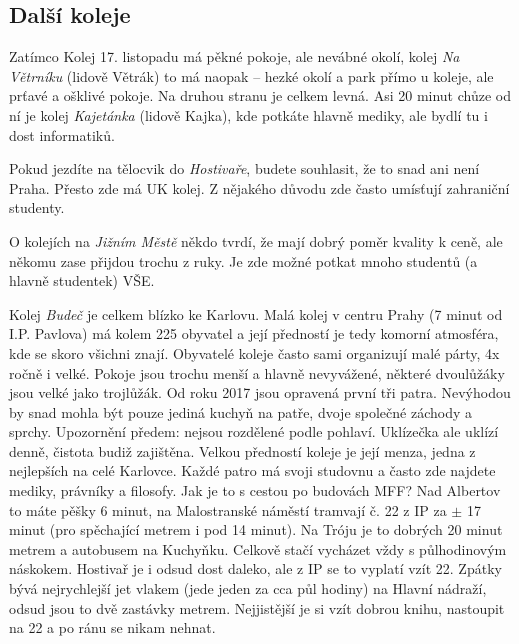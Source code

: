 \subsection{Další koleje}
Zatímco Kolej 17. listopadu má pěkné pokoje, ale nevábné okolí, kolej \textit{Na
Větrníku} (lidově Větrák) to má naopak – hezké okolí a park přímo u koleje, ale
prťavé a ošklivé pokoje. Na druhou stranu je celkem levná. Asi 20 minut chůze od
ní je kolej \textit{Kajetánka} (lidově Kajka), kde potkáte hlavně mediky, ale
bydlí tu i dost informatiků.

Pokud jezdíte na tělocvik do \textit{Hostivaře}, budete souhlasit, že to snad
ani není Praha. Přesto zde má UK kolej. Z nějakého důvodu zde často umísťují
zahraniční studenty.

O kolejích na \textit{Jižním Městě} někdo tvrdí, že mají dobrý poměr kvality k
ceně, ale někomu zase přijdou trochu z ruky. Je zde možné potkat mnoho studentů
(a hlavně studentek) VŠE.

Kolej \textit{Budeč} je celkem blízko ke Karlovu. Malá kolej v centru Prahy (7
minut od I.P. Pavlova) má kolem 225 obyvatel a její předností je tedy komorní
atmosféra, kde se skoro všichni znají. Obyvatelé koleje často sami organizují
malé párty, 4x ročně i velké. Pokoje jsou trochu menší a hlavně nevyvážené,
některé dvoulůžáky jsou velké jako trojlůžák. Od roku 2017 jsou opravená první
tři patra. Nevýhodou by snad mohla být pouze jediná kuchyň na patře, dvoje
společné záchody a sprchy. Upozornění předem: nejsou rozdělené podle pohlaví.
Uklízečka ale uklízí denně, čistota budiž zajištěna. Velkou předností koleje je
její menza, jedna z nejlepších na celé Karlovce. Každé patro má svoji studovnu a
často zde najdete mediky, právníky a filosofy. Jak je to s cestou po budovách
MFF? Nad Albertov to máte pěšky 6 minut, na Malostranské náměstí tramvají č. 22
z IP za $\pm$ 17 minut (pro spěchající metrem i pod 14 minut). Na Tróju je to
dobrých 20 minut metrem a autobusem na Kuchyňku. Celkově stačí vycházet vždy s
půlhodinovým náskokem. Hostivař je i odsud dost daleko, ale z IP se to vyplatí
vzít 22. Zpátky bývá nejrychlejší jet vlakem (jede jeden za cca půl hodiny) na
Hlavní nádraží, odsud jsou to dvě zastávky metrem. Nejjistější je si vzít dobrou
knihu, nastoupit na 22 a po ránu se nikam nehnat.

